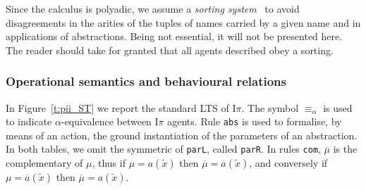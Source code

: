 \documentclass[11pt,a4paper]{amsart}
\theoremstyle{plain}
\theoremstyle{definition}
\theoremstyle{defC}
\theoremstyle{thmC}
\theoremstyle{plain}
\numberwithin{equation}{section}
\newcommand{\equival}{\equiv_\alpha }
\newcommand{\trans}[1]{\mbox{{\tt #1}}}
\def\inp#1#2{#1(#2)}
\def\bout#1#2{\overline{#1}(#2)}   %
\newcommand{\outC}[1]{\overline{#1}}      %
\newcommand{\til}[1]{\widetilde{#1}}
\newcommand{\tilb}{{\til b}}
\newcommand{\tila}{{\til a}}
\newcommand{\tilx}{\tilde{x}}
\newcommand{\Intp}{\mbox{I$\pi$}\xspace}   %
\newcommand{\piI}{\Intp}   %
\def\sub#1#2{\{\raisebox{.5ex}{\small$#1$}\! / \!\mbox{\small$#2$}\}}
\theoremstyle{plain}
\theoremstyle{definition}
\begin{document}
Since the calculus is polyadic, 
we assume a \emph{sorting system}~\cite{Mil91}
   to avoid disagreements  in the arities of
the tuples of names 
carried by a given name 
and in applications of abstractions.
Being not essential, it will not be presented here.
The reader should
take for granted that all agents described obey a sorting. 



\subsubsection{Operational semantics and behavioural relations}
\label{sss:os_piI}

In Figure~\ref{t:pii_ST}
we report the standard LTS of \piI.
The symbol $\equival$ is used to indicate $\alpha$-equivalence
between \piI agents.
Rule  {\trans{abs}} is used to formalise, by means of an action, the ground instantiation
of the parameters of an abstraction. 
In both tables, we omit the symmetric of {\tt parL}, called {\tt parR}.
In rules {\tt com}, $\outC \mu$ is the complementary of $\mu$, 
thus if $\mu = \inp  a \tilx$
then  $\outC\mu = \bout  a \tilx$, and conversely if  $\mu = \bout  a \tilx$
then  $\outC\mu = \inp  a \tilx$. 
\end{document}
